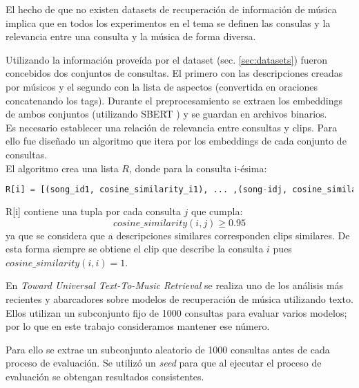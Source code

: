 El hecho de que no existen datasets de recuperación de información de música implica que en todos los experimentos en el tema se definen las consulas y la relevancia entre una consulta y la música de forma diversa.

Utilizando la información proveída por el dataset (sec. \ref{sec:datasets}) fueron concebidos dos conjuntos de consultas. El primero con las descripciones creadas por músicos y el segundo con la lista de aspectos (convertida en oraciones concatenando los tags). Durante el preprocesamiento se extraen los embeddings de ambos conjuntos (utilizando SBERT \cite{Reimers2019SentenceBERTSE}) y se guardan en archivos binarios. \\
Es necesario establecer una relación de relevancia entre consultas y clips. Para ello fue diseñado un algoritmo que itera por los embeddings de cada conjunto de consultas. \\
El algoritmo crea una lista $R$, donde para la consulta i-ésima:
\begin{lstlisting}[language=Python]
R[i] = [(song_id1, cosine_similarity_i1), ... ,(song-idj, cosine_similarity_ij)]
\end{lstlisting}
R[i] contiene una tupla por cada consulta $j$ que cumpla: $$cosine\_similarity(i,j) \geq 0.95$$ ya que se considera que a descripciones similares corresponden clips similares. De esta forma siempre se obtiene el clip que describe la consulta $i$ pues $cosine\_similarity(i,i) = 1$.
 
En \textit{Toward Universal Text-To-Music Retrieval} \cite{Doh2022TowardUT} se realiza uno de los análisis más recientes y abarcadores sobre modelos de recuperación de música utilizando texto. Ellos utilizan un subconjunto fijo de 1000 consultas para evaluar varios modelos; por lo que en este trabajo consideramos mantener ese número.

Para ello se extrae un subconjunto aleatorio de 1000 consultas antes de cada proceso de evaluación. Se utilizó un \textit{seed} para que al ejecutar el proceso de evaluación se obtengan resultados consistentes. 


